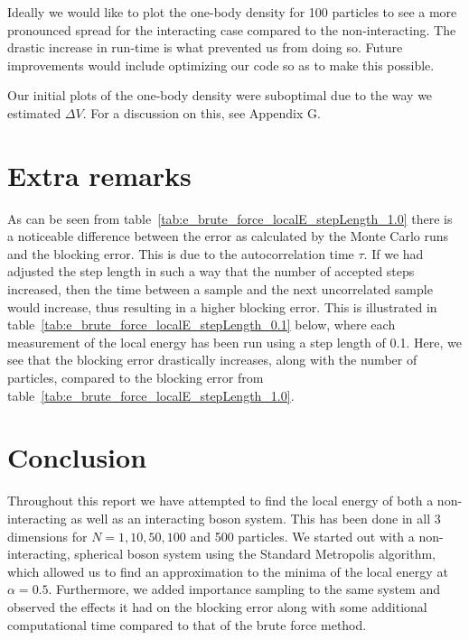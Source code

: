 \documentclass[
    a4paper, aps, twocolumn, floatfix, superscriptaddress,
    nofootinbib]{revtex4-1}
\begin{document}
Ideally we would like to plot the one-body density for 100 particles to see a more pronounced spread for the interacting case compared to the non-interacting. The drastic increase in run-time is what prevented us from doing so. Future improvements would include optimizing our code so as to make this possible. 

Our initial plots of the one-body density were suboptimal due to the way we estimated $\Delta V$. For a discussion on this, see Appendix G.


\section{Extra remarks}\label{sec:extra_remarks}
As can be seen from table~\ref{tab:e_brute_force_localE_stepLength_1.0} there is a noticeable difference between the error as calculated by the Monte Carlo runs and the blocking error. This is due to the autocorrelation time $\tau$. If we had adjusted the step length in such a way that the number of accepted steps increased, then the time between a sample and the next uncorrelated sample would increase, thus resulting in a higher blocking error. This is illustrated in table~\ref{tab:e_brute_force_localE_stepLength_0.1} below, where each measurement of the local energy has been run using a step length of 0.1. Here, we see that the blocking error drastically increases, along with the number of particles, compared to the blocking error from table~\ref{tab:e_brute_force_localE_stepLength_1.0}.

\section{Conclusion}
Throughout this report we have attempted to find the local energy of both a non-interacting as well as an interacting boson system. This has been done in all 3 dimensions for $N = 1, 10, 50, 100$ and 500 particles. We started out with a non-interacting, spherical boson system using the Standard Metropolis algorithm, which allowed us to find an approximation to the minima of the local energy at $\alpha = 0.5$. 
Furthermore, we added importance sampling to the same system and observed the effects it had on the blocking error along with some additional computational time compared to that of the brute force method.
\end{document}
